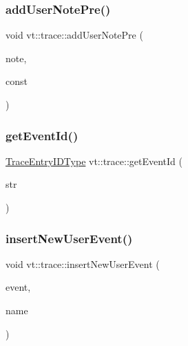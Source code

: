 \subsubsection{\texorpdfstring{add\+User\+Note\+Pre()}{addUserNotePre()}}
{\footnotesize\ttfamily void vt\+::trace\+::add\+User\+Note\+Pre (\begin{DoxyParamCaption}\item[{std\+::string const \&}]{note,  }\item[{\hyperlink{namespacevt_1_1trace_a64a7185f3e102df8d8258f263ccd1582}{Trace\+Event\+I\+D\+Type}}]{const }\end{DoxyParamCaption})}

\mbox{\label{namespacevt_1_1trace_ac7c4c6c55b38e5c03f0e541946bcf375}} 
\subsubsection{\texorpdfstring{get\+Event\+Id()}{getEventId()}}
{\footnotesize\ttfamily \hyperlink{namespacevt_1_1trace_a3c14050715ba9eceaeff51fb3de64f2f}{Trace\+Entry\+I\+D\+Type} vt\+::trace\+::get\+Event\+Id (\begin{DoxyParamCaption}\item[{std\+::string const \&}]{str }\end{DoxyParamCaption})}

\mbox{\label{namespacevt_1_1trace_acbaabde4144cf5291fcc65983e7dc7a0}} 
\subsubsection{\texorpdfstring{insert\+New\+User\+Event()}{insertNewUserEvent()}}
{\footnotesize\ttfamily void vt\+::trace\+::insert\+New\+User\+Event (\begin{DoxyParamCaption}\item[{\hyperlink{namespacevt_1_1trace_a5908920d051c144c89f17c69ed262350}{User\+Event\+I\+D\+Type}}]{event,  }\item[{std\+::string const \&}]{name }\end{DoxyParamCaption})}

